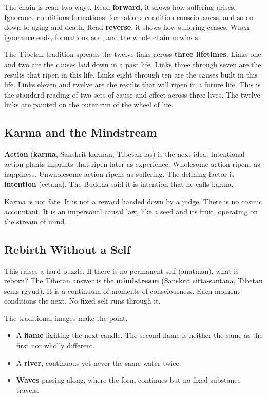 The chain is read two ways. Read \textbf{forward}, it shows how suffering arises. Ignorance conditions formations, formations condition consciousness, and so on down to aging and death. Read \textbf{reverse}, it shows how suffering ceases. When ignorance ends, formations end, and the whole chain unwinds.

The Tibetan tradition spreads the twelve links across \textbf{three lifetimes}. Links one and two are the causes laid down in a past life. Links three through seven are the results that ripen in this life. Links eight through ten are the causes built in this life. Links eleven and twelve are the results that will ripen in a future life. This is the standard reading of two sets of cause and effect across three lives. The twelve links are painted on the outer rim of the wheel of life.

\subsection{Karma and the Mindstream}

\textbf{Action} (\textbf{karma}, Sanskrit karman, Tibetan las) is the next idea. Intentional action plants imprints that ripen later as experience. Wholesome action ripens as happiness. Unwholesome action ripens as suffering. The defining factor is \textbf{intention} (cetana). The Buddha said it is intention that he calls karma.

Karma is not fate. It is not a reward handed down by a judge. There is no cosmic accountant. It is an impersonal causal law, like a seed and its fruit, operating on the stream of mind.

\subsection{Rebirth Without a Self}

This raises a hard puzzle. If there is no permanent self (anatman), what is reborn? The Tibetan answer is the \textbf{mindstream} (Sanskrit citta-santana, Tibetan sems rgyud). It is a continuum of moments of consciousness. Each moment conditions the next. No fixed self runs through it.

The traditional images make the point.

\begin{itemize}
 \item A \textbf{flame} lighting the next candle. The second flame is neither the same as the first nor wholly different.
 \item A \textbf{river}, continuous yet never the same water twice.
 \item \textbf{Waves} passing along, where the form continues but no fixed substance travels.
\end{itemize}

